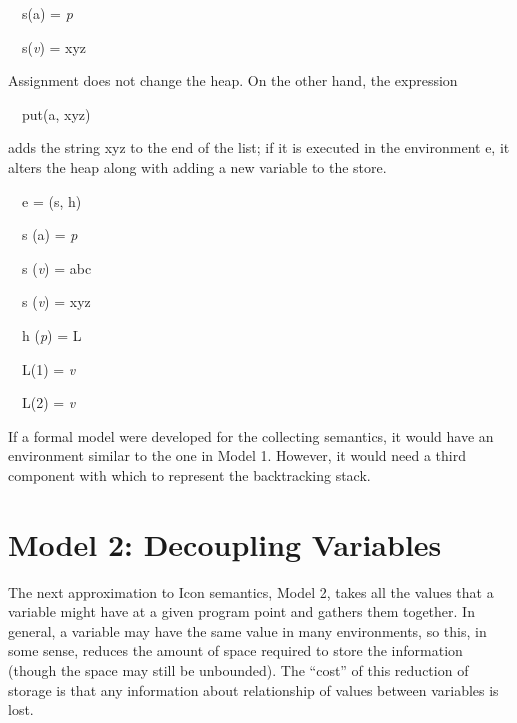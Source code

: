 {\ttfamily\mdseries
\ \ s(a) = \textit{p}\textit{}}

{\ttfamily\mdseries
\ \ s(\textit{v}\textit{}) = {\textquotedbl}xyz{\textquotedbl}}


Assignment does not change the heap. On the other hand, the expression 

{\ttfamily\mdseries
\ \ put(a, {\textquotedbl}xyz{\textquotedbl})}

\noindent adds the string xyz to the end of the list; if it is
executed in the environment e, it alters the heap along with adding a
new variable to the store.

{\ttfamily\mdseries
\ \ e = (s, h)}

{\ttfamily\mdseries
\ \ s (a) = \textit{p}\textit{}}

{\ttfamily\mdseries
\ \ s (\textit{v}\textit{}) = {\textquotedbl}abc{\textquotedbl}}

{\ttfamily\mdseries
\ \ s (\textit{v}\textit{}) = {\textquotedbl}xyz{\textquotedbl}}

{\ttfamily\mdseries
\ \ h (\textit{p}\textit{}) = L}

{\ttfamily\mdseries
\ \ L(1) = \textit{v}\textit{}}

{\ttfamily\mdseries
\ \ L(2) = \textit{v}\textit{}}


If a formal model were developed for the collecting semantics, it
would have an environment similar to the one in Model 1. However, it
would need a third component with which to represent the backtracking
stack.

\section{Model 2: Decoupling Variables}

The next approximation to Icon semantics, Model 2, takes all the
values that a variable might have at a given program point and gathers
them together. In general, a variable may have the same value in many
environments, so this, in some sense, reduces the amount of space
required to store the information (though the space may still be
unbounded). The ``cost'' of this reduction of storage is that any
information about relationship of values between variables is lost.

